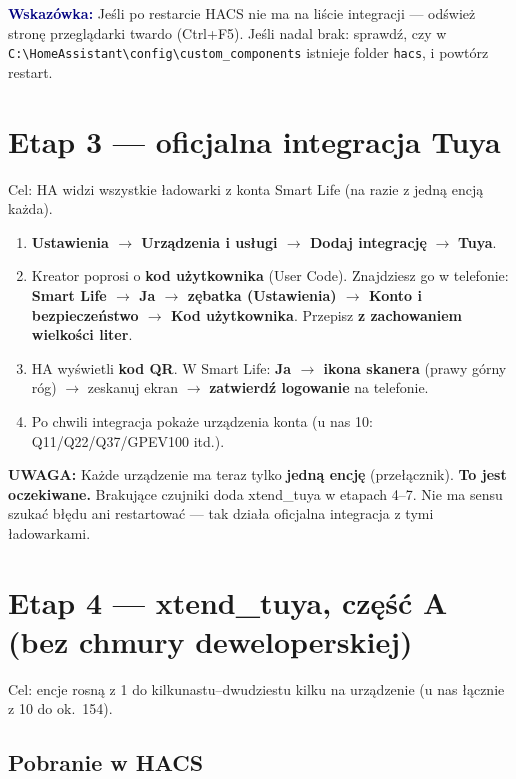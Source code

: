 \documentclass[11pt,a4paper]{article}
\newcommand{\uwaga}[1]{\par\medskip\noindent\textcolor{warnred}{\textbf{UWAGA:}} #1\par\medskip}
\newcommand{\wskazowka}[1]{\par\medskip\noindent\textcolor{navy}{\textbf{Wskazówka:}} #1\par\medskip}
\begin{document}
\wskazowka{Jeśli po restarcie HACS nie ma na liście integracji --- odśwież stronę przeglądarki twardo (Ctrl+F5). Jeśli nadal brak: sprawdź, czy w \texttt{C:\textbackslash HomeAssistant\textbackslash config\textbackslash custom\_components} istnieje folder \texttt{hacs}, i powtórz restart.}

\section{Etap 3 --- oficjalna integracja Tuya}
\label{sec:etap3}

Cel: HA widzi wszystkie ładowarki z konta Smart Life (na razie z jedną encją każda).

\begin{enumerate}
\item \textbf{Ustawienia $\to$ Urządzenia i usługi $\to$ Dodaj integrację} $\to$ \textbf{Tuya}.
\item Kreator poprosi o \textbf{kod użytkownika} (User Code). Znajdziesz go w telefonie: \textbf{Smart Life $\to$ Ja $\to$ zębatka (Ustawienia) $\to$ Konto i bezpieczeństwo $\to$ Kod użytkownika}. Przepisz \textbf{z zachowaniem wielkości liter}.
\item HA wyświetli \textbf{kod QR}. W Smart Life: \textbf{Ja $\to$ ikona skanera} (prawy górny róg) $\to$ zeskanuj ekran $\to$ \textbf{zatwierdź logowanie} na telefonie.
\item Po chwili integracja pokaże urządzenia konta (u nas 10: Q11/Q22/Q37/GPEV100 itd.).
\end{enumerate}

\uwaga{Każde urządzenie ma teraz tylko \textbf{jedną encję} (przełącznik). \textbf{To jest oczekiwane.} Brakujące czujniki doda xtend\_tuya w etapach 4--7. Nie ma sensu szukać błędu ani restartować --- tak działa oficjalna integracja z tymi ładowarkami.}

\section{Etap 4 --- xtend\_tuya, część A (bez chmury deweloperskiej)}
\label{sec:etap4}

Cel: encje rosną z 1 do kilkunastu--dwudziestu kilku na urządzenie (u nas łącznie z 10 do ok.~154).

\subsection{Pobranie w HACS}
\end{document}

